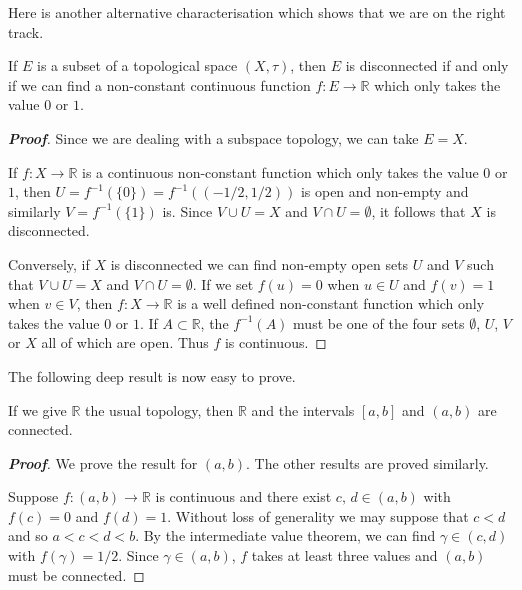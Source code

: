 Here is another alternative characterisation which
shows that we are on the right track.



\begin{theorem}\label{T;connected via integer} 
If $E$ is a subset of a topological
space $(X,\tau)$, then $E$ is disconnected if and
only if we can find a non-constant continuous
function $f:E\rightarrow{\mathbb R}$ which only
takes the value $0$ or $1$.
\end{theorem}
\begin{proof}[\bf Proof] Since we are dealing with a subspace topology,
we can take $E=X$.

If $f:X\rightarrow{\mathbb R}$ is a continuous
non-constant function which only
takes the value $0$ or $1$, then
$U=f^{-1}(\{0\})=f^{-1}((-1/2,1/2))$ is open and non-empty
and similarly $V=f^{-1}(\{1\})$ is. Since $V\cup U=X$ 
and $V\cap U=\emptyset$, it follows that $X$ is disconnected.
 
Conversely, if $X$ is disconnected we can find non-empty
open sets $U$ and $V$ such that  $V\cup U=X$ 
and $V\cap U=\emptyset$. If we set $f(u)=0$ when $u\in U$
and $f(v)=1$ when $v\in V$, then 
$f:X\rightarrow{\mathbb R}$ is a well defined
non-constant function which only
takes the value $0$ or $1$. If $A\subset{\mathbb R}$,
the $f^{-1}(A)$ must be one of the four sets
$\emptyset$, $U$, $V$ or $X$ all of which are open.
Thus $f$ is continuous.
\end{proof}



The following deep result is now easy to prove.



\begin{theorem}\label{T;reals connected}
If we give ${\mathbb R}$ the usual topology,
then ${\mathbb R}$ and the  intervals $[a,b]$
and $(a,b)$ are connected.
\end{theorem}
\begin{proof}[\bf Proof] We prove the result for $(a,b)$. The other
results are proved similarly.

Suppose $f:(a,b)\rightarrow{\mathbb R}$ is continuous
and there exist $c,\,d\in (a,b)$ with $f(c)=0$
and $f(d)=1$. Without loss of generality
we may suppose that $c<d$ and so $a<c<d<b$.
By the intermediate value theorem, we can find $\gamma\in(c,d)$
with $f(\gamma)=1/2$. Since $\gamma\in(a,b)$, $f$ takes
at least three values and $(a,b)$ must be connected.
\end{proof} 



